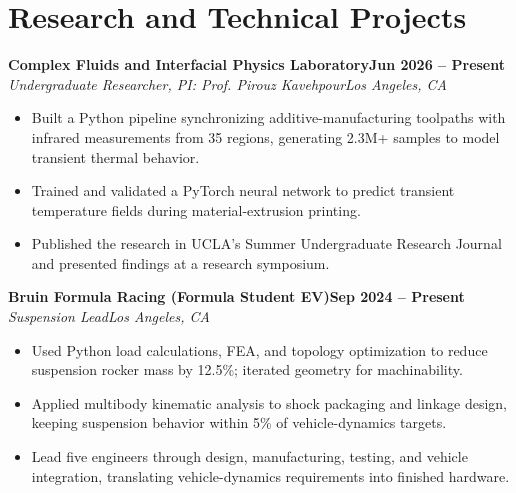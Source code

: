 \documentclass[10pt,letterpaper]{article}
\newcommand{\entry}[4]{%
  \textbf{#1}\hfill\textbf{#2}\\
  \textit{#3}\hfill\textit{#4}\par
}
\begin{document}
\section{Research and Technical Projects}
\entry{Complex Fluids and Interfacial Physics Laboratory}{Jun 2026 -- Present}
{Undergraduate Researcher, PI: Prof. Pirouz Kavehpour}{Los Angeles, CA}
\begin{itemize}
  \item Built a Python pipeline synchronizing additive-manufacturing toolpaths with infrared measurements from 35 regions, generating 2.3M+ samples to model transient thermal behavior.
  \item Trained and validated a PyTorch neural network to predict transient temperature fields during material-extrusion printing.
  \item Published the research in UCLA's Summer Undergraduate Research Journal and presented findings at a research symposium.
\end{itemize}
\vspace{3pt}
\entry{Bruin Formula Racing (Formula Student EV)}{Sep 2024 -- Present}
{Suspension Lead}{Los Angeles, CA}
\begin{itemize}
  \item Used Python load calculations, FEA, and topology optimization to reduce suspension rocker mass by 12.5\%; iterated geometry for machinability.
  \item Applied multibody kinematic analysis to shock packaging and linkage design, keeping suspension behavior within 5\% of vehicle-dynamics targets.
  \item Lead five engineers through design, manufacturing, testing, and vehicle integration, translating vehicle-dynamics requirements into finished hardware.
\end{itemize}
\end{document}
